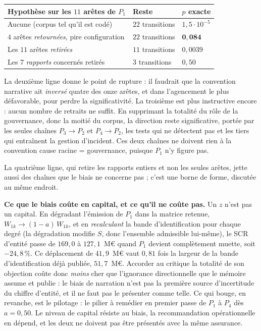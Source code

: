 \begin{center}\small
\renewcommand{\arraystretch}{1.25}
\begin{tabular}{@{}l l l@{}}
\toprule
\textbf{Hypothèse sur les $11$ arêtes de $P_1$} & \textbf{Reste} & $p$ \textbf{exacte} \\
\midrule
Aucune (corpus tel qu'il est codé) & $22$ transitions & $1{,}5\cdot10^{-5}$ \\
$4$ arêtes \emph{retournées}, pire configuration & $22$ transitions & $\mathbf{0{,}084}$ \\
Les $11$ arêtes \emph{retirées} & $11$ transitions & $0{,}0039$ \\
Les $7$ \emph{rapports} concernés retirés & $3$ transitions & $0{,}50$ \\
\bottomrule
\end{tabular}
\end{center}

\vspace{2pt}
La deuxième ligne donne le point de rupture : il faudrait que la convention narrative ait
\emph{inversé} quatre des onze arêtes, et dans l'agencement le plus défavorable, pour perdre
la significativité. La troisième est plus instructive encore : aucun nombre de retraits
ne suffit. En supprimant la totalité du rôle de la gouvernance, donc la moitié du corpus, la
direction reste significative, portée par les seules chaînes $P_3\to P_2$ et $P_4\to P_2$, les
tests qui ne détectent pas et les tiers qui entraînent la gestion d'incident. Ces deux chaînes
ne doivent rien à la convention \og cause racine = gouvernance\fg{}, puisque $P_1$ n'y figure pas.

La quatrième ligne, qui retire les rapports entiers et non les seules arêtes, jette aussi des
chaînes que le biais ne concerne pas ; c'est une borne de forme, discutée au même endroit.

\begin{cle}
\textbf{Ce que le biais coûte en capital, et ce qu'il ne coûte pas.} Un $z$ n'est pas un
capital. En dégradant l'émission de $P_1$ dans la matrice retenue,
$W_{1k}\to(1-a)\,W_{1k}$, et en \emph{recalculant} la bande d'identification pour chaque degré
(la dégradation modifie $S$, donc l'ensemble admissible lui-même), le SCR d'entité passe
de $169{,}0$ à $127{,}1$~M\euro{} quand $P_1$ devient complètement muette, soit $-24{,}8\,\%$.
Ce déplacement de $41{,}9$~M\euro{} vaut $0{,}81$ fois la largeur de la bande
d'identification déjà publiée, $51{,}7$~M\euro. Accorder au critique la totalité de son
objection coûte donc \emph{moins} cher que l'ignorance directionnelle que le mémoire assume et
publie : le biais de narration n'est pas la première source d'incertitude du chiffre d'entité,
et il ne faut pas le présenter comme telle. Ce qui bouge, en revanche, est le pilotage :
le pilier à remédier en premier passe de $P_1$ à $P_4$ dès $a = 0{,}50$. Le niveau de capital
résiste au biais, la recommandation opérationnelle en dépend, et les deux ne doivent pas être
présentés avec la même assurance.
\end{cle}

